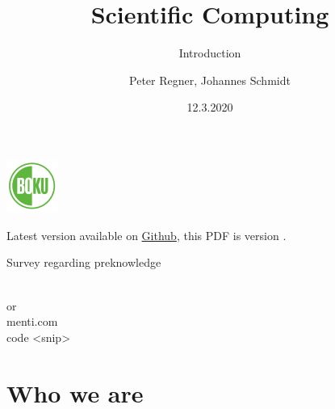 \documentclass[10pt,color=usenames,dvipsnames]{beamer}
\title[Scientific Computing]{Scientific Computing}
\subtitle{Introduction}
\author{Peter Regner, Johannes Schmidt}
\institute{Institute for Sustainable Economic Development, BOKU, Wien}
\date{12.3.2020}
\newcommand{\gitrevision}{%
  \StrLeft{\HEAD}{7}%
}
\begin{document}
\begin{frame}[plain]
    \maketitle
    \begin{center}
        \includegraphics[height=1.7cm]{boku-logo.pdf}\\
    \end{center}
    \vfill
    {
        \tiny
        Latest version available on
        \href{https://github.com/inwe-boku/lecture-scientific-computing/}{Github},
        this PDF is version \gitrevision.
    }
\end{frame}

\begin{frame}{Survey regarding preknowledge}
    \begin{center}
        \textcolor{black}{
        }\\
        \vspace{0.5cm}
        \huge{
            or\\
            menti.com\\
            code <snip>
        }
    \end{center}
\end{frame}

\begin{frame}

	\tableofcontents

\end{frame}

\section{Who we are}
\end{document}
